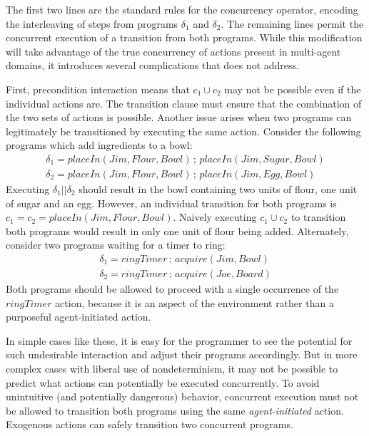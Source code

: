 The first two lines are the standard rules for the concurrency operator,
encoding the interleaving of steps from programs $\delta_{1}$ and
$\delta_{2}$. The remaining lines permit the concurrent execution
of a transition from both programs. While this modification will take
advantage of the true concurrency of actions present in multi-agent
domains, it introduces several complications that \citep{pinto99tcongolog}
does not address.

First, precondition interaction means that $c_{1}\cup c_{2}$ may
not be possible even if the individual actions are. The transition
clause must ensure that the combination of the two sets of actions
is possible. Another issue arises when two programs can legitimately
be transitioned by executing the same action. Consider the following
programs which add ingredients to a bowl:\begin{gather*}
\delta_{1}=placeIn(Jim,Flour,Bowl)\,;\, placeIn(Jim,Sugar,Bowl)\\
\delta_{2}=placeIn(Jim,Flour,Bowl)\,;\, placeIn(Jim,Egg,Bowl)\end{gather*}
 Executing $\delta_{1}||\delta_{2}$ should result in the bowl containing
two units of flour, one unit of sugar and an egg. However, an individual
transition for both programs is $c_{1}=c_{2}=placeIn(Jim,Flour,Bowl)$.
Naively executing $c_{1}\cup c_{2}$ to transition both programs would
result in only one unit of flour being added. Alternately, consider
two programs waiting for a timer to ring:\begin{gather*}
\delta_{1}=ringTimer\,;\, acquire(Jim,Bowl)\\
\delta_{2}=ringTimer\,;\, acquire(Joe,Board)\end{gather*}
 Both programs should be allowed to proceed with a single occurrence
of the $ringTimer$ action, because it is an aspect of the environment
rather than a purposeful agent-initiated action.

In simple cases like these, it is easy for the programmer to see the
potential for such undesirable interaction and adjust their programs
accordingly. But in more complex cases with liberal use of nondeterminism,
it may not be possible to predict what actions can potentially be
executed concurrently. To avoid unintuitive (and potentially dangerous)
behavior, concurrent execution must not be allowed to transition both
programs using the same \emph{agent-initiated} action. Exogenous actions
can safely transition two concurrent programs.

